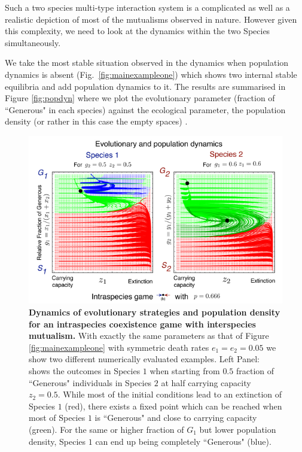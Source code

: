 \documentclass[12pt]{article}
\begin{document}
Such a two species multi-type interaction system is a complicated as well as a realistic depiction of most of the mutualisms observed in nature.
However given this complexity, we need to look at the dynamics within the two Species simultaneously.

We take the most stable situation observed in the dynamics when population dynamics is absent (Fig.~\ref{fig:mainexampleone}) which shows two internal stable equilibria and add population dynamics to it.
The results are summarised in Figure \ref{fig:popdyn} where we plot the evolutionary parameter (fraction of ``Generous" in each species) against the ecological parameter, the population density (or rather in this case the empty spaces) .

\begin{figure}
\begin{center}
\includegraphics[width=\columnwidth]{../Figures/mainexamplepopdyn2.pdf}
\caption{\small{
\textbf{Dynamics of evolutionary strategies and population density for an intraspecies coexistence game with interspecies mutualism.}
With exactly the same parameters as that of Figure \ref{fig:mainexampleone} with  symmetric death rates $e_1 = e_2 = 0.05$ we show two different numerically evaluated examples.
Left Panel: shows the outcomes in Species $1$ when starting from $0.5$ fraction of ``Generous" individuals in Species $2$ at half carrying capacity $z_2 = 0.5$.
While most of the initial conditions lead to an extinction of Species $1$ (red), there exists a fixed point which can be reached when most of Species $1$ is ``Generous" and close to carrying capacity (green). For the same or higher fraction of $G_1$ but lower population density, Species $1$ can end up being completely ``Generous" (blue).
}}
\end{center}
\end{figure}
\end{document}
